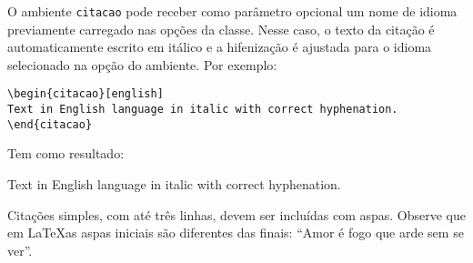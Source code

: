 O ambiente \texttt{citacao} pode receber como parâmetro opcional um nome de
idioma previamente carregado nas opções da classe. Nesse
caso, o texto da citação é automaticamente escrito em itálico e a hifenização é
ajustada para o idioma selecionado na opção do ambiente. Por exemplo:

\begin{verbatim}
\begin{citacao}[english]
Text in English language in italic with correct hyphenation.
\end{citacao}
\end{verbatim}

Tem como resultado:

\begin{citacao}[english]
    Text in English language in italic with correct hyphenation.
\end{citacao}

Citações simples, com até três linhas, devem ser
incluídas com aspas. Observe que em \LaTeX as aspas iniciais são diferentes das
finais: ``Amor é fogo que arde sem se ver''.

